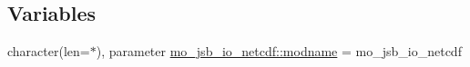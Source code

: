 \subsection*{Variables}
\begin{DoxyCompactItemize}
\item 
character(len=$\ast$), parameter \hyperlink{namespacemo__jsb__io__netcdf_a9e42139581fe6002bdbc58266020b84a}{mo\+\_\+jsb\+\_\+io\+\_\+netcdf\+::modname} = \textquotesingle{}mo\+\_\+jsb\+\_\+io\+\_\+netcdf\textquotesingle{}
\end{DoxyCompactItemize}
